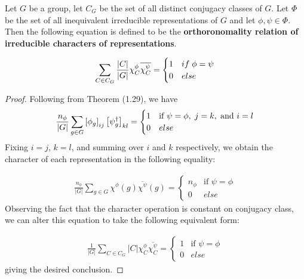 \begin{theorem}
	Let $G$ be a group, let $C_G$ be the set of all distinct conjugacy classes of $G$. Let $\Phi$ be the set of all inequivalent irreducible representations of $G$ and let $\phi,\psi\in\Phi$. Then the following equation is defined to be the \textbf{orthoronomality relation of irreducible characters of representations}.

$$\sum_{C \in C_G} \frac{|C|}{|G|} \chi^{\phi}_C \overline{\chi^{\psi}_C } = \begin{cases}
																1 & if \hspace{1mm} \phi = \psi \\
																0 & else
															\end{cases}$$
\end{theorem}
\noindent \begin{proof}\cite{Tung}  Following from Theorem (1.29), we have 
$$\frac{n_\phi}{|G|} \sum_{g\in G} \left[\phi_g \right]_{ij} \left[\psi_g^\dag \right]_{kl} = \begin{cases}
																						1 & \text{if } \psi = \phi,\hspace{1mm} j=k,\hspace{1mm} \text{and } i=l\\
																						0 & else
																					 \end{cases}$$
Fixing $i=j$, $k=l$, and summing over $i$ and $k$ respectively, we obtain the character of each representation in the following equality:

\begin{equation}
	\begin{aligned}
		\frac{n_\phi}{|G|} \sum_{g\in G} \chi^\phi(g) \overline{\chi^\psi}(g) = \begin{cases}
																						n_\phi & \text{if } \psi = \phi \\
																						0 & else
																					 \end{cases}
	\end{aligned}
\end{equation}
Observing the fact that the character operation is constant on conjugacy class, we can alter this equation to take the following equivalent form:

\begin{equation}
	\begin{aligned}
		\frac{1}{|G|} \sum_{C\in C_G} |C| \chi^\phi_C \overline{\chi^\psi_C}= \begin{cases}
																						1 & \text{if } \psi = \phi \\
																						0 & else
																					 \end{cases}
	\end{aligned}
\end{equation}
giving the desired conclusion.  \end{proof}

